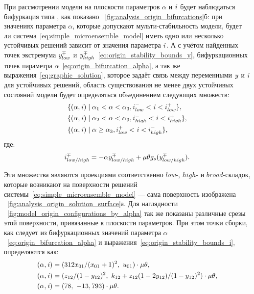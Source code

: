 При рассмотрении модели на плоскости параметров $\alpha$ и $\mathit{i}$ будет наблюдаться бифуркация типа , как показано \onfigure~\ref{fig:analysis_origin_bifurcations}б: при значениях параметра $\alpha$, которые допускают мульти-стабильность модели, будет ли система~\eqref{eq:simple_microensemble_model} иметь одно или несколько устойчивых решений зависит от значения параметра $\mathit{i}$. А с учётом найденных точек экстремума $\mathit{y}^{\mp}_{low}$ и $\mathit{y}^{\mp}_{high}$~\eqref{eq:origin_stability_bounds_y}, бифуркационных точек параметра $\alpha$~\eqref{eq:origin_bifurcation_alpha}, а так же выражения~\eqref{eq:graphic_solution}, которое задаёт связь между переменными $\mathit{y}$ и $\mathit{i}$ для устойчивых решений, область существования не менее двух устойчивых состояний модели будет определяться объединением следующих множеств:
\begin{equation}
    \label{eq:origin_stability_area}
    \begin{aligned}
        &\{ (\alpha, \mathit{i}) \mid \alpha_{1} < \alpha < \alpha_{3}, i^{-}_{low} < \mathit{i} < i^{+}_{low} \}, \\
        &\{ (\alpha, \mathit{i}) \mid \alpha_{2} < \alpha < \alpha_{3}, i^{-}_{high} < \mathit{i} < i^{+}_{high} \}, \\
        &\{ (\alpha, \mathit{i}) \mid \alpha \ge \alpha_{3}, i^{+}_{low} < \mathit{i} < i^{-}_{high} \}, \\
    \end{aligned}
\end{equation}
где:
\begin{equation}
    \label{eq:origin_stability_bounds_i}
    i^{\mp}_{low/high} = -\alpha \mathit{y}^{\mp}_{low/high} + \mu \theta g_{s}(\mathit{y}^{\mp}_{low/high}).
\end{equation}

Эти множества являются проекциями соответственно $low$-, $high$- и $broad$-складок, которые возникают на поверхности решений системы~\eqref{eq:simple_microensemble_model} --- сама поверхность изображена \onfigure~\ref{fig:analysis_origin_solution_surface}а. Для наглядности \onfigure~\ref{fig:model_origin_configurations_by_alpha} так же показаны различные срезы этой поверхности, привязанные к плоскости параметров. При этом точки сборки, как следует из бифуркационных значений параметра $\alpha$~\eqref{eq:origin_bifurcation_alpha} и выражения~\eqref{eq:origin_stability_bounds_i}, определяются как:
\begin{equation}
    \nonumber
    \begin{aligned}
        &(\alpha, \scalar{i}) = ( 312 x_{01} / (x_{01} + 1)^2 ,\ u_{01} ) \cdot \mu \theta, \\
        &(\alpha, \scalar{i}) = ( z_{12} / (1 - y_{12})^2     ,\ k_{12} + z_{12} (1 - 2 y_{12}) / (1 - y_{12})^{2} ) \cdot \mu \theta, \\
        &(\alpha, \scalar{i}) = ( 78                          ,\ -13,793 ) \cdot \mu \theta.
    \end{aligned}
\end{equation}

